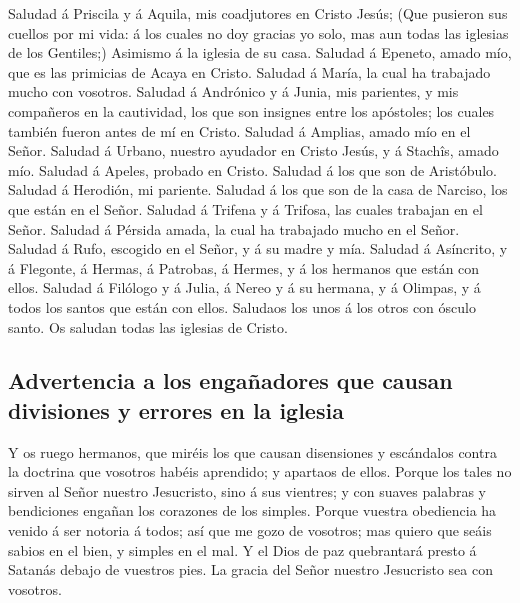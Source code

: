  Saludad á Priscila y á Aquila, mis coadjutores en Cristo
Jesús;  (Que pusieron sus cuellos por mi vida: á los
cuales no doy gracias yo solo, mas aun todas las iglesias de los
Gentiles;)  Asimismo á la iglesia de su casa. Saludad á
Epeneto, amado mío, que es las primicias de Acaya en Cristo.
 Saludad á María, la cual ha trabajado mucho con vosotros.
 Saludad á Andrónico y á Junia, mis parientes, y mis
compañeros en la cautividad, los que son insignes entre los apóstoles;
los cuales también fueron antes de mí en Cristo.  Saludad
á Amplias, amado mío en el Señor.  Saludad á Urbano,
nuestro ayudador en Cristo Jesús, y á Stachîs, amado mío.
 Saludad á Apeles, probado en Cristo. Saludad á los que
son de Aristóbulo.  Saludad á Herodión, mi pariente.
Saludad á los que son de la casa de Narciso, los que están en el Señor.
 Saludad á Trifena y á Trifosa, las cuales trabajan en el
Señor. Saludad á Pérsida amada, la cual ha trabajado mucho en el Señor.
 Saludad á Rufo, escogido en el Señor, y á su madre y
mía.  Saludad á Asíncrito, y á Flegonte, á Hermas, á
Patrobas, á Hermes, y á los hermanos que están con ellos.
 Saludad á Filólogo y á Julia, á Nereo y á su hermana, y
á Olimpas, y á todos los santos que están con ellos. 
Saludaos los unos á los otros con ósculo santo. Os saludan todas las
iglesias de Cristo.

\hypertarget{advertencia-a-los-engauxf1adores-que-causan-divisiones-y-errores-en-la-iglesia}{%
\subsection{Advertencia a los engañadores que causan divisiones y
errores en la
iglesia}\label{advertencia-a-los-engauxf1adores-que-causan-divisiones-y-errores-en-la-iglesia}}

 Y os ruego hermanos, que miréis los que causan
disensiones y escándalos contra la doctrina que vosotros habéis
aprendido; y apartaos de ellos.  Porque los tales no
sirven al Señor nuestro Jesucristo, sino á sus vientres; y con suaves
palabras y bendiciones engañan los corazones de los simples.
 Porque vuestra obediencia ha venido á ser notoria á
todos; así que me gozo de vosotros; mas quiero que seáis sabios en el
bien, y simples en el mal.  Y el Dios de paz quebrantará
presto á Satanás debajo de vuestros pies. La gracia del Señor nuestro
Jesucristo sea con vosotros.

